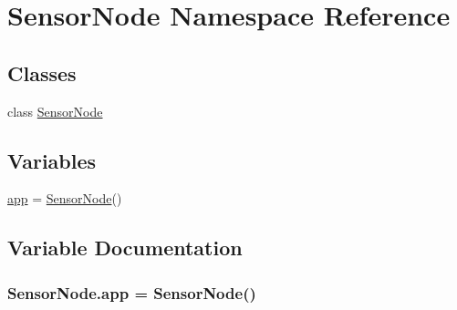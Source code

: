 \hypertarget{namespaceSensorNode}{}\section{Sensor\+Node Namespace Reference}
\label{namespaceSensorNode}
\subsection*{Classes}
\begin{DoxyCompactItemize}
\item 
class \hyperlink{classSensorNode_1_1SensorNode}{Sensor\+Node}
\end{DoxyCompactItemize}
\subsection*{Variables}
\begin{DoxyCompactItemize}
\item 
\hyperlink{namespaceSensorNode_a1c06b14e3f48f507247d5b8e0e910f35}{app} = \hyperlink{classSensorNode_1_1SensorNode}{Sensor\+Node}()
\end{DoxyCompactItemize}


\subsection{Variable Documentation}
\subsubsection[{\texorpdfstring{app}{app}}]{\setlength{\rightskip}{0pt plus 5cm}Sensor\+Node.\+app = {\bf Sensor\+Node}()}\hypertarget{namespaceSensorNode_a1c06b14e3f48f507247d5b8e0e910f35}{}\label{namespaceSensorNode_a1c06b14e3f48f507247d5b8e0e910f35}
